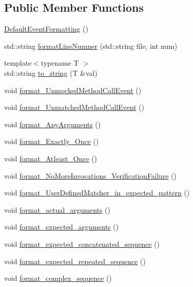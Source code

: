 \subsection*{Public Member Functions}
\begin{DoxyCompactItemize}
\item 
\mbox{\hyperlink{structDefaultEventFormatting_a5d8525fcb62e69059c380d231768241f}{Default\+Event\+Formatting}} ()
\item 
std\+::string \mbox{\hyperlink{structDefaultEventFormatting_ada7ccf556cfb99d784d85503f5f191b4}{format\+Line\+Numner}} (std\+::string file, int num)
\item 
{\footnotesize template$<$typename T $>$ }\\std\+::string \mbox{\hyperlink{structDefaultEventFormatting_a2d24d92651609c3a232fda8eb7342c89}{to\+\_\+string}} (T \&val)
\item 
void \mbox{\hyperlink{structDefaultEventFormatting_a7087e08b38809c93efb935eebf3b4991}{format\+\_\+\+Unmocked\+Method\+Call\+Event}} ()
\item 
void \mbox{\hyperlink{structDefaultEventFormatting_abf1b021b7dbc605defe081e812869d4b}{format\+\_\+\+Unmatched\+Method\+Call\+Event}} ()
\item 
void \mbox{\hyperlink{structDefaultEventFormatting_abff7a22a8fc69f34e68e1b58668b4d2b}{format\+\_\+\+Any\+Arguments}} ()
\item 
void \mbox{\hyperlink{structDefaultEventFormatting_a264ebf3db4923de2a8948b296617f49a}{format\+\_\+\+Exactly\+\_\+\+Once}} ()
\item 
void \mbox{\hyperlink{structDefaultEventFormatting_aa99933d6174f90cd9cd7bd4a27520cdf}{format\+\_\+\+Atleast\+\_\+\+Once}} ()
\item 
void \mbox{\hyperlink{structDefaultEventFormatting_a3612f30e31da5a12f7de695d8ac5e68f}{format\+\_\+\+No\+More\+Invocations\+\_\+\+Verification\+Failure}} ()
\item 
void \mbox{\hyperlink{structDefaultEventFormatting_a6ba6bc35bf9d0a01ce60c2f7129074b0}{format\+\_\+\+User\+Defined\+Matcher\+\_\+in\+\_\+expected\+\_\+pattern}} ()
\item 
void \mbox{\hyperlink{structDefaultEventFormatting_a564ab136b90d0ea0b3d7c80fdba15b63}{format\+\_\+actual\+\_\+arguments}} ()
\item 
void \mbox{\hyperlink{structDefaultEventFormatting_a66645e3f570c19f9ec7bad08e1bc7f34}{format\+\_\+expected\+\_\+arguments}} ()
\item 
void \mbox{\hyperlink{structDefaultEventFormatting_a406aed3772d0c4719961af17987280ee}{format\+\_\+expected\+\_\+concatenated\+\_\+sequence}} ()
\item 
void \mbox{\hyperlink{structDefaultEventFormatting_a108f7e2fb9e532d81cb76544d1edfb92}{format\+\_\+expected\+\_\+repeated\+\_\+sequence}} ()
\item 
void \mbox{\hyperlink{structDefaultEventFormatting_a53237821d13de3366262ea892e7997ec}{format\+\_\+complex\+\_\+sequence}} ()
\end{DoxyCompactItemize}
